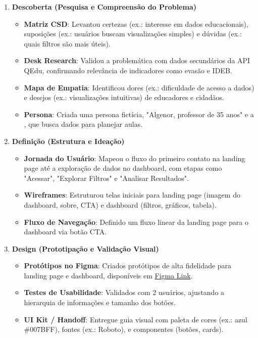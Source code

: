 \documentclass[a4paper,12pt]{article}
\begin{document}
\begin{enumerate}
    \item \textbf{Descoberta (Pesquisa e Compreensão do Problema)}
    \begin{itemize}
        \item \textbf{Matriz CSD}: Levantou certezas (ex.: interesse em dados educacionais), suposições (ex.: usuários buscam visualizações simples) e dúvidas (ex.: quais filtros são mais úteis).
        \item \textbf{Desk Research}: Validou a problemática com dados secundários da API QEdu, confirmando relevância de indicadores como evasão e IDEB.
        \item \textbf{Mapa de Empatia}: Identificou dores (ex.: dificuldade de acesso a dados) e desejos (ex.: visualizações intuitivas) de educadores e cidadãos.
        \item \textbf{Persona}: Criada uma persona fictícia, "Algenor, professor de 35 anos" e a , que busca dados para planejar aulas.
    \end{itemize}

    \item \textbf{Definição (Estrutura e Ideação)}
    \begin{itemize}
        \item \textbf{Jornada do Usuário}: Mapeou o fluxo do primeiro contato na landing page até a exploração de dados no dashboard, com etapas como "Acessar", "Explorar Filtros" e "Analisar Resultados".
        \item \textbf{Wireframes}: Estruturou telas iniciais para landing page (imagem do dashboard, sobre, CTA) e dashboard (filtros, gráficos, tabela).
        \item \textbf{Fluxo de Navegação}: Definido um fluxo linear da landing page para o dashboard via botão CTA.
    \end{itemize}

    \item \textbf{Design (Prototipação e Validação Visual)}
    \begin{itemize}
        \item \textbf{Protótipos no Figma}: Criados protótipos de alta fidelidade para landing page e dashboard, disponíveis em \href{https://www.figma.com/design/4vshnHxQPJHBihycsaqVKe/4%C2%BA-desafio-do-trilhas?node-id=13-4&t=EUorml7Y47f2oeh1-0}{Figma Link}.
        \item \textbf{Testes de Usabilidade}: Validados com 2 usuários, ajustando a hierarquia de informações e tamanho dos botões.
        \item \textbf{UI Kit / Handoff}: Entregue guia visual com paleta de cores (ex.: azul \#007BFF), fontes (ex.: Roboto), e componentes (botões, cards).
    \end{itemize}
\end{enumerate}
\end{document}
